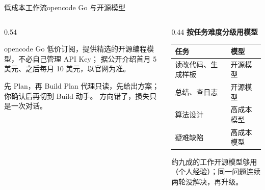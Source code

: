 \documentclass[aspectratio=169]{beamer}
\begin{document}
\begin{frame}{低成本工作流}{opencode Go 与开源模型}
  \begin{columns}[T]
    \begin{column}{0.54\textwidth}
      \begin{block}{opencode Go}
        \small 低价订阅，提供精选的开源编程模型，不必自己管理 API Key；
        据公开介绍首月 5 美元、之后每月 10 美元，以官网为准。
      \end{block}
      \begin{block}{先 Plan，再 Build}
        \small Plan 代理只读，先给出方案；你确认后再切到 Build 动手。
        方向错了，损失只是一次对话。
      \end{block}
    \end{column}
    \begin{column}{0.44\textwidth}
      \textcolor{sig}{\textbf{按任务难度分级用模型}}\\[4pt]
      \begin{center}
      \footnotesize
      \begin{tabular}{ll}
        \toprule
        \textbf{任务} & \textbf{模型} \\
        \midrule
        读改代码、生成样板 & 开源模型 \\
        总结、查日志 & 开源模型 \\
        算法设计 & 高成本模型 \\
        疑难缺陷 & 高成本模型 \\
        \bottomrule
      \end{tabular}
      \end{center}
      \textcolor{soft}{\small 约九成的工作开源模型够用（个人经验）；同一问题连续两轮没解决，再升级。}
    \end{column}
  \end{columns}
\end{frame}
\end{document}
